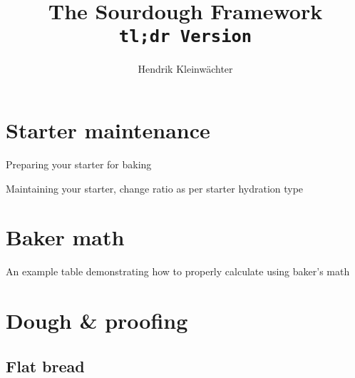 \documentclass[paper=a4, twoside=false, fontsize=12pt]{scrbook}
\author{Hendrik Kleinwächter}
\title{The Sourdough Framework\\\texttt{tl;dr Version}}
\begin{document}
\maketitle

\section*{Starter maintenance}
\begin{flowchart}[!htb]

\caption*{Preparing your starter for baking}
\end{flowchart}

\begin{flowchart}[!htb]

\caption*{Maintaining your starter, change ratio as per starter hydration type}
\end{flowchart}

\clearpage{}
\section*{Baker math}

\begin{table}[!htb]
  
  \caption[Baker's math example]{An example table demonstrating how to
      properly calculate using baker's math}
\end{table}


\section*{Dough \& proofing}
\subsection*{Flat bread}

\clearpage{}
\end{document}
